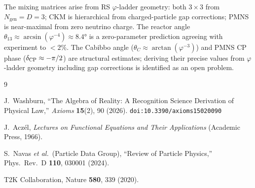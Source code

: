 \documentclass[12pt,a4paper]{article}
\theoremstyle{definition}
\theoremstyle{remark}
\begin{document}
The mixing matrices arise from RS $\varphi$-ladder geometry: both
$3 \times 3$ from $N_{\mathrm{gen}} = D = 3$; CKM is hierarchical
from charged-particle gap corrections; PMNS is near-maximal from
zero neutrino charge.  The reactor angle $\theta_{13} \approx
\arcsin(\varphi^{-4}) \approx 8.4°$ is a zero-parameter prediction
agreeing with experiment to $< 2\%$.  The Cabibbo angle
($\theta_C \approx \arctan(\varphi^{-3})$) and PMNS CP phase
($\delta_{\rm CP} \approx -\pi/2$) are structural estimates;
deriving their precise values from $\varphi$-ladder geometry
including gap corrections is identified as an open problem.

\begin{thebibliography}{9}

  J.~Washburn, ``The Algebra of Reality: A Recognition Science Derivation
  of Physical Law,'' \emph{Axioms} \textbf{15}(2), 90 (2026).
  \texttt{doi:10.3390/axioms15020090}

  J.~Acz\'el, \emph{Lectures on Functional Equations and Their
  Applications} (Academic Press, 1966).

  S.~Navas \textit{et al.}\ (Particle Data Group),
  ``Review of Particle Physics,'' Phys.\ Rev.\ D \textbf{110}, 030001
  (2024).

  T2K Collaboration, Nature \textbf{580}, 339 (2020).

\end{thebibliography}
\end{document}
